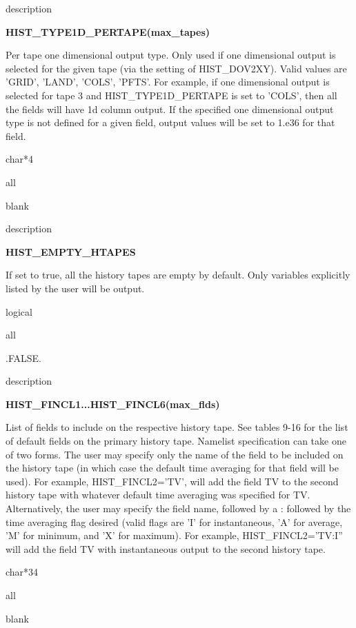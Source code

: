 \begin{Ventry}{description}
 \item[{\bf name}] {\bf HIST\_TYPE1D\_PERTAPE(max\_tapes)}   
 \item[description] 
	Per tape one dimensional output type. 
	Only used if one dimensional output is selected for the given tape 
	(via the setting of HIST\_DOV2XY). 
	Valid values are 'GRID', 'LAND', 'COLS', 'PFTS'.
	For example, if one dimensional output is selected for tape 3 and 
	HIST\_TYPE1D\_PERTAPE is set to 'COLS', then all the fields will have 1d 
	column output. If the specified one dimensional output type
	is not defined for a given field, output values will be set to 1.e36 
	for that field.
 \item[type] char*4
 \item[mode] all    
 \item[default] blank
\end{Ventry}
\medskip

\begin{Ventry}{description}
 \item[{\bf name}] {\bf HIST\_EMPTY\_HTAPES}   
 \item[description] 
	If set to true, all the history tapes are empty by default.
	Only variables explicitly listed by the user will be output.
 \item[type] logical
 \item[mode] all    
 \item[default] .FALSE.
\end{Ventry}
\medskip

\begin{Ventry}{description}
 \item[{\bf name}] {\bf HIST\_FINCL1...HIST\_FINCL6(max\_flds)}   
 \item[description] 
	List of fields to include on the respective history tape. See
	tables 9-16 for the list of default fields on the primary
	history tape. Namelist specification can take one of two
	forms.  The user may specify only the name of the field to be
	included on the history tape (in which case the default time
	averaging for that field will be used).  For example,
	HIST\_FINCL2='TV', will add the field TV to the second history
	tape with whatever default time averaging was specified for
	TV. Alternatively, the user may specify the field name,
	followed by a : followed by the time averaging flag desired
	(valid flags are 'I' for instantaneous, 'A' for average, 'M'
	for minimum, and 'X' for maximum). For example,
	HIST\_FINCL2='TV:I'' will add the field TV with instantaneous
	output to the second history tape.  
 \item[type] char*34
 \item[mode] all 
 \item[default] blank
\end{Ventry}
\medskip

